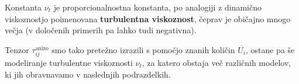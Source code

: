\documentclass[mat2, tisk]{fmfdelo}
\newcommand{\bd}{\textbf}
\begin{document}
Konstanta $\nu_t$ je proporcionalnostna konstanta, po analogiji z dinamično viskoznostjo
poimenovana \bd{turbulentna viskoznost}, čeprav je običajno mnogo
večja (v določenih primerih pa lahko tudi negativna).

Tenzor $\tau_{ij}^{\mathrm{anizo}}$ smo tako pretežno izrazili s pomočjo
znanih količin $\overline{U_i}$, ostane pa še modeliranje
turbulentne viskoznosti $\nu_t$, za katero obstaja več različnih
modelov, ki jih obravnavamo v naslednjih podrazdelkih.




\end{document}
